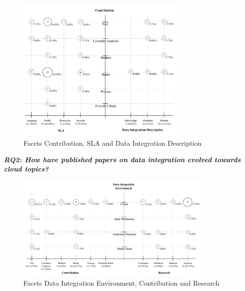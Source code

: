 \begin{figure}[ht!]
\centering
\includegraphics[width=0.75\textwidth]{figs/bubble-charts/Contribution-SLA-DIdescription.pdf}
  
\caption{Facets Contribution, SLA and Data Integration Description}\label{fig:facet1}
\end{figure} 

\textbf{\textit{RQ2: How have published papers on data integration evolved towards cloud topics?}}
\begin{figure}[h]
\centering
\includegraphics[width=0.86\textwidth]{figs/bubble-charts/DI-Environment-Contribution-Research.pdf}
\caption{Facets Data Integration Environment, Contribution and Research}\label{fig:facet2}
\end{figure}

